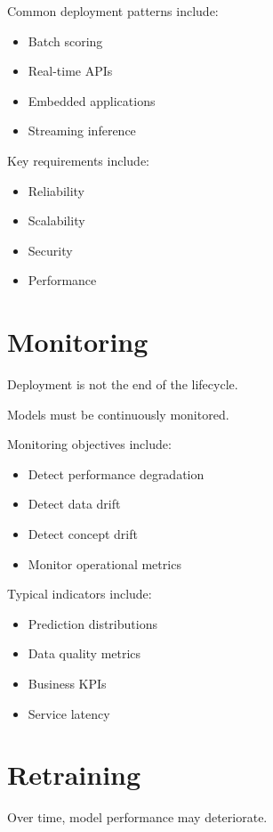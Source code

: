 Common deployment patterns include:

\begin{itemize}
    \item Batch scoring
    \item Real-time APIs
    \item Embedded applications
    \item Streaming inference
\end{itemize}

Key requirements include:

\begin{itemize}
    \item Reliability
    \item Scalability
    \item Security
    \item Performance
\end{itemize}

\section{Monitoring}

Deployment is not the end of the lifecycle.

Models must be continuously monitored.

Monitoring objectives include:

\begin{itemize}
    \item Detect performance degradation
    \item Detect data drift
    \item Detect concept drift
    \item Monitor operational metrics
\end{itemize}

Typical indicators include:

\begin{itemize}
    \item Prediction distributions
    \item Data quality metrics
    \item Business KPIs
    \item Service latency
\end{itemize}

\section{Retraining}

Over time, model performance may deteriorate.

